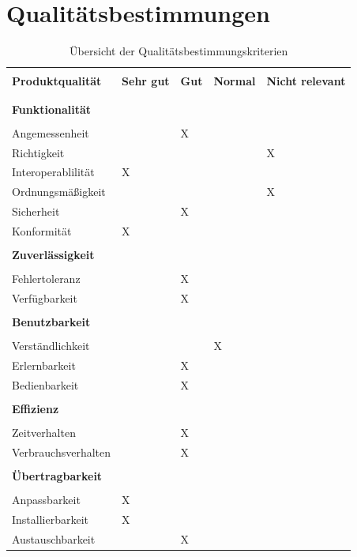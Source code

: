 \documentclass[a4paper,20pt,oneside]{book}
\begin{document}
\chapter{Qualitätsbestimmungen}

\begin{table}[H]
\centering
\begin{tabular}{|l| l l l l|}
\hline \\
 \textbf{Produktqualität} & \textbf{Sehr gut} & \textbf{Gut} & \textbf{Normal} & \textbf{Nicht relevant} \\\\ \hline \hline \\
 \textbf{Funktionalität} &  &  &  &  \\ \hline \\
 Angemessenheit & & X &  &  \\
 Richtigkeit &  &  &  & X  \\
 Interoperablilität & X &  &  &  \\
 Ordnungsmäßigkeit &  &  &  & X \\
 Sicherheit &  & X &  &  \\ 
 Konformität & X &  &  &  \\ \hline\hline \\
 \textbf{Zuverlässigkeit} &  &  &  &  \\ \hline \\
 Fehlertoleranz &  & X &  &  \\
 Verfügbarkeit &  & X &  &  \\ \hline\hline \\
 \textbf{Benutzbarkeit} &  &  &  &  \\ \hline \\
 Verständlichkeit &  &  & X &  \\
 Erlernbarkeit &  & X &  &  \\
 Bedienbarkeit &  & X &  &  \\ \hline\hline \\
 \textbf{Effizienz} &  &  &  &  \\ \hline \\
 Zeitverhalten &  & X  &  &  \\
 Verbrauchsverhalten &  & X &  &  \\ \hline\hline \\
 \textbf{Übertragbarkeit} &  &  &  &  \\ \hline \\
 Anpassbarkeit & X &  &  &  \\
 Installierbarkeit & X &  &  &  \\
 Austauschbarkeit &  & X &  & \\ \hline\hline
\end{tabular}
\caption{Übersicht der Qualitätsbestimmungskriterien}
\end{table}
\end{document}

